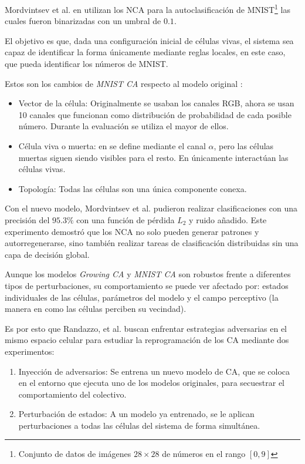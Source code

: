 Mordvintsev et al. en \cite{MNIST} utilizan los NCA para la autoclasificación de MNIST\footnote{Conjunto de datos de imágenes $28 \times 28$ de números en el rango $[0,9]$} las cuales fueron binarizadas con un umbral de $0.1$. 

El objetivo es que, dada una configuración inicial de células vivas, el sistema sea capaz de identificar la forma únicamente mediante reglas locales, en este caso, que pueda identificar los números de MNIST.

Estos son los cambios de \textit{MNIST CA} respecto al modelo original \cite{mordvintsevNCA}:
\begin{itemize}
	\item Vector de la célula: Originalmente se usaban los canales RGB, ahora se usan 10 canales que funcionan como distribución de probabilidad de cada posible número. Durante la evaluación se utiliza el mayor de ellos.
	
	\item Célula viva o muerta: en \cite{mordvintsevNCA} se define mediante el canal $\alpha$, pero las células muertas siguen siendo visibles para el resto. En \cite{MNIST}  únicamente interactúan las células vivas.
	
	\item Topología: Todas las células son una única componente conexa.
\end{itemize}

Con el nuevo modelo, Mordvintsev et al. pudieron realizar clasificaciones con una precisión del $95.3\%$ con una función de pérdida $L_2$ y ruido añadido. Este experimento demostró que los NCA no solo pueden generar patrones y autorregenerarse, sino también realizar tareas de clasificación distribuidas sin una capa de decisión global.

Aunque los modelos \textit{Growing CA} y \textit{MNIST CA} son robustos frente a diferentes tipos de perturbaciones, su comportamiento se puede ver afectado por: estados individuales de las células, parámetros del modelo y el campo perceptivo (la manera en como las células perciben su vecindad).

Es por esto que Randazzo, et al. \cite{randazzoNCA} buscan enfrentar estrategias adversarias en el mismo espacio celular para estudiar la reprogramación de los CA mediante dos experimentos:
\begin{enumerate}
	\item Inyección de adversarios: Se entrena un nuevo modelo de CA, que se coloca en el entorno que ejecuta uno de los modelos originales, para secuestrar el comportamiento del colectivo.
	
	\item Perturbación de estados: A un modelo ya entrenado, se le aplican perturbaciones a todas las células del sistema de forma simultánea.
\end{enumerate}

